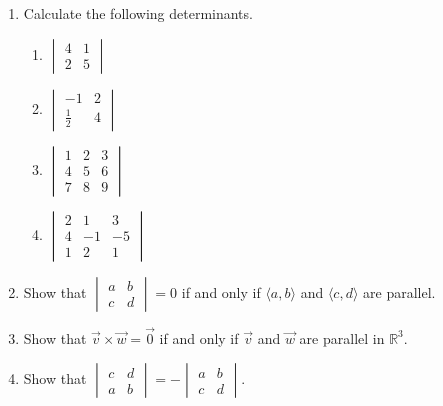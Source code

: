 \begin{enumerate}
\item  Calculate the following determinants.
\begin{enumerate}
\item  $\begin{vmatrix}
4 & 1 \\
2 & 5
\end{vmatrix}$ \\

\item  $\begin{vmatrix}
-1 & 2 \\
\frac{1}{2} & 4
\end{vmatrix}$ \\

\item  $\begin{vmatrix}
1 & 2 & 3 \\
4 & 5 & 6 \\
7 & 8 & 9
\end{vmatrix}$ \\

\item  $\begin{vmatrix}
2 & 1 & 3 \\
4 & -1 & -5 \\
1 & 2 & 1
\end{vmatrix}$ \\
\end{enumerate}

\item  Show that $\begin{vmatrix}
a & b \\
c & d
\end{vmatrix} = 0$ if and only if $\langle a, b \rangle$ and $\langle c, d \rangle$ are parallel.  \\

\item  Show that $\vec{v} \times \vec{w} = \vec{0}$ if and only if $\vec{v}$ and $\vec{w}$ are parallel in $\mathbb{R}^3$.  \\

\item  Show that $\begin{vmatrix}
c & d \\
a & b
\end{vmatrix} = - \begin{vmatrix}
a & b \\
c & d
\end{vmatrix}$.  \\


\end{enumerate}
